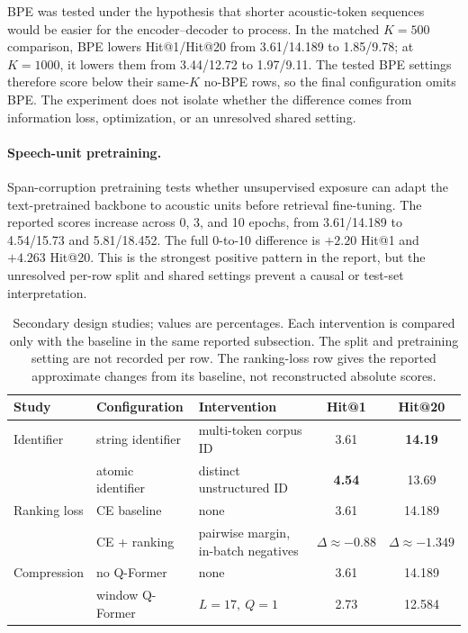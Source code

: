 BPE was tested under the hypothesis that shorter acoustic-token sequences
would be easier for the encoder--decoder to process. In the matched \(K=500\)
comparison, BPE lowers Hit@1/Hit@20 from 3.61/14.189 to 1.85/9.78; at
\(K=1000\), it lowers them from 3.44/12.72 to 1.97/9.11. The tested BPE
settings therefore score below their same-\(K\) no-BPE rows, so the final
configuration omits BPE. The experiment does not isolate whether the
difference comes from information loss, optimization, or an unresolved shared
setting.

\paragraph{Speech-unit pretraining.}
Span-corruption pretraining tests whether unsupervised exposure can adapt the
text-pretrained backbone to acoustic units before retrieval fine-tuning. The
reported scores increase across 0, 3, and 10 epochs, from 3.61/14.189 to
4.54/15.73 and 5.81/18.452. The full 0-to-10 difference is \(+2.20\) Hit@1
and \(+4.263\) Hit@20. This is the strongest positive pattern in the report,
but the unresolved per-row split and shared settings prevent a causal or
test-set interpretation.

\begin{table}[t]
\centering
\small
\setlength{\tabcolsep}{5pt}
\begin{tabular}{@{}lllcc@{}}
\toprule
Study & Configuration & Intervention & Hit@1 & Hit@20 \\
\midrule
Identifier & string identifier & multi-token corpus ID & 3.61 & \textbf{14.19} \\
& atomic identifier & distinct unstructured ID & \textbf{4.54} & 13.69 \\
\midrule
Ranking loss & CE baseline & none & 3.61 & 14.189 \\
& CE + ranking & pairwise margin, in-batch negatives & \(\Delta{\approx}{-}0.88\) & \(\Delta{\approx}{-}1.349\) \\
\midrule
Compression & no Q-Former & none & 3.61 & 14.189 \\
& window Q-Former & \(L=17,\ Q=1\) & 2.73 & 12.584 \\
\bottomrule
\end{tabular}
\caption{Secondary design studies; values are percentages. Each intervention
is compared only with the baseline in the same reported subsection. The split
and pretraining setting are not recorded per row. The ranking-loss row gives
the reported approximate changes from its baseline, not reconstructed absolute
scores.}
\label{tab:secondary-ablation}
\end{table}

